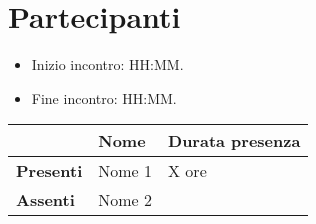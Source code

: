 \section{Partecipanti}

\begin{itemize}
    \item Inizio incontro: HH:MM.
    \item Fine incontro: HH:MM.
\end{itemize}


\begin{center}
{\renewcommand{\arraystretch}{1.5}
\begin{tabular}{lll}
	                    & \textbf{Nome}  & \textbf{Durata presenza} \\
	\hline
	\textbf{Presenti}   & Nome 1            & X ore     \\
	\hline
	\textbf{Assenti}	& Nome 2            &      		\\
\end{tabular}	
}
\end{center}